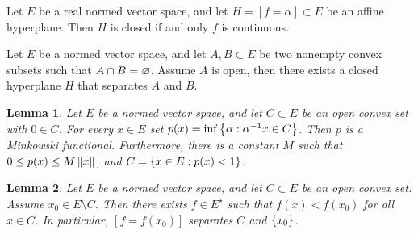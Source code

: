 \documentclass[11pt]{article}
\theoremstyle{plain}
\newtheorem{lemma}{Lemma}[section]
\begin{document}
\begin{proposition}
    Let $E$ be a real normed vector space, and let $H=[f=\alpha]\subset E$ be an affine hyperplane. Then $H$ is closed if and only $f$ is continuous.
\end{proposition}

\begin{theorem}
    Let $E$ be a normed vector space, and let $A,B\subset E$ be two nonempty convex subsets such that $A\cap B = \varnothing$. Assume $A$ is open, then there exists a closed hyperplane $H$ that separates $A$ and $B$.
\end{theorem}

\begin{lemma}
    Let $E$ be a normed vector space, and let $C\subset E$ be an open convex set with $0\in C$. For every $x\in E$ set $p(x)= \inf \left\{\alpha : \alpha^{-1}x\in C\right\}$. Then $p$ is a Minkowski functional. Furthermore, there is a constant $M$ such that $0\leq p(x)\leq M\left\lVert x\right\rVert$, and $C = \left\{x\in E: p(x)<1\right\}$.
\end{lemma}

\begin{lemma}
    Let $E$ be a normed vector space, and let $C\subset E$ be an open convex set. Assume $x_0\in E\setminus C$. Then there exists $f\in E^\star$ such that $f(x)< f(x_0)$ for all $x\in C$. In particular, $[f=f(x_0)]$ separates $C$ and $\left\{x_0\right\}$.
\end{lemma}
\end{document}
